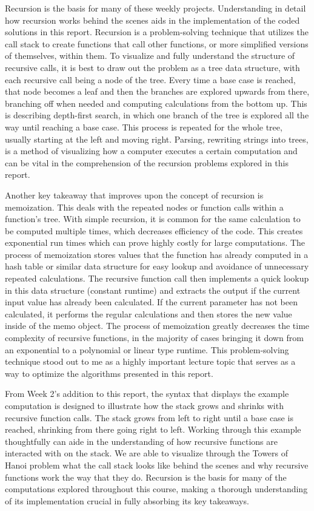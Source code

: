 \documentclass{article}
\theoremstyle{theorem}
\theoremstyle{definition}
\theoremstyle{remark}
\begin{document}
Recursion is the basis for many of these weekly projects. Understanding in detail how recursion works behind the scenes aids in the implementation of the coded solutions in this report. Recursion is a problem-solving technique that utilizes the call stack to create functions that call other functions, or more simplified versions of themselves, within them. To visualize and fully understand the structure of recursive calls, it is best to draw out the problem as a tree data structure, with each recursive call being a node of the tree. Every time a base case is reached, that node becomes a leaf and then the branches are explored upwards from there, branching off when needed and computing calculations from the bottom up. This is describing depth-first search, in which one branch of the tree is explored all the way until reaching a base case. This process is repeated for the whole tree, usually starting at the left and moving right. Parsing, rewriting strings into trees, is a method of visualizing how a computer executes a certain computation and can be vital in the comprehension of the recursion problems explored in this report. 

Another key takeaway that improves upon the concept of recursion is memoization. This deals with the repeated nodes or function calls within a function's tree. With simple recursion, it is common for the same calculation to be computed multiple times, which decreases efficiency of the code. This creates exponential run times which can prove highly costly for large computations. The process of memoization stores values that the function has already computed in a hash table or similar data structure for easy lookup and avoidance of unnecessary repeated calculations. The recursive function call then implements a quick lookup in this data structure (constant runtime) and extracts the output if the current input value has already been calculated. If the current parameter has not been calculated, it performs the regular calculations and then stores the new value inside of the memo object. The process of memoization greatly decreases the time complexity of recursive functions, in the majority of cases bringing it down from an exponential to a polynomial or linear type runtime. This problem-solving technique stood out to me as a highly important lecture topic that serves as a way to optimize the algorithms presented in this report.

From Week 2's addition to this report, the syntax that displays the example computation is designed to illustrate how the stack grows and shrinks with recursive function calls. The stack grows from left to right until a base case is reached, shrinking from there going right to left. Working through this example thoughtfully can aide in the understanding of how recursive functions are interacted with on the stack. We are able to visualize through the Towers of Hanoi problem what the call stack looks like behind the scenes and why recursive functions work the way that they do. Recursion is the basis for many of the computations explored throughout this course, making a thorough understanding of its implementation crucial in fully absorbing its key takeaways. 
\end{document}
